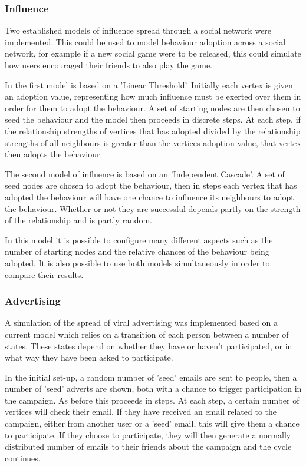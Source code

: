 \documentclass[12pt,a4paper]{article}
\begin{document}
\subsubsection{Influence}

Two established models of influence spread through a social network \cite{kempe2003maximizing} were implemented. This could be used to model behaviour adoption across a social network, for example if a new social game were to be released, this could simulate how users encouraged their friends to also play the game.

In the first model is based on a 'Linear Threshold'. Initially each vertex is given an adoption value, representing how much influence must be exerted over them in order for them to adopt the behaviour. A set of starting nodes are then chosen to seed the behaviour and the model then proceeds in discrete steps. At each step, if the relationship strengths of vertices that has adopted divided by the relationship strengths of all neighbours is greater than the vertices adoption value, that vertex then adopts the behaviour.

The second model of influence is based on an 'Independent Cascade'. A set of seed nodes are chosen to adopt the behaviour, then in steps each vertex that has adopted the behaviour will have one chance to influence its neighbours to adopt the behaviour. Whether or not they are successful depends partly on the strength of the relationship and is partly random.

In this model it is possible to configure many different aspects such as the number of starting nodes and the relative chances of the behaviour being adopted. It is also possible to use both models simultaneously in order to compare their results.

\subsubsection{Advertising}

A simulation of the spread of viral advertising was implemented based on a current model \cite{van2010viral} which relies on a transition of each person between a number of states. These states depend on whether they have or haven’t participated, or in what way they have been asked to participate.

In the initial set-up, a random number of 'seed' emails are sent to people, then a number of 'seed' adverts are shown, both with a chance to trigger participation in the campaign. As before this proceeds in steps. At each step, a certain number of vertices will check their email. If they have received an email related to the campaign, either from another user or a 'seed' email, this will give them a chance to participate. If they choose to participate, they will then generate a normally distributed number of emails to their friends about the campaign and the cycle continues.
\end{document}
